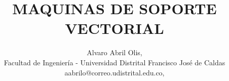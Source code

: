 

\title{MAQUINAS DE SOPORTE VECTORIAL}
\author{ Alvaro Abril Olis,\\
Facultad de Ingeniería - Universidad Distrital Francisco José de Caldas\\
aabrilo@correo.udistrital.edu.co,\\
}


\maketitle









%

